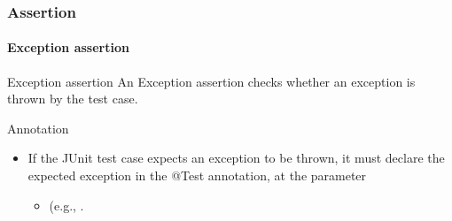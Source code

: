 \begin{frame}[parent={concept:assertion}, hasprev=false, hasnext=false]
\frametitle{Assertion}
\framesubtitle{Exception assertion}
\label{concept:junit-exception-assertion}
\label{concept:exception-assertion}

\begin{block:concept}{Exception assertion}
An Exception assertion checks whether an exception is thrown by the test case.
\end{block:concept}


\begin{block:fact}{Annotation}
\begin{itemize}
	\item If the JUnit test case expects an exception to be thrown, it must
	declare the expected exception in the @Test annotation, at the
	 parameter
	\begin{itemize}
		\item (e.g., .
	\end{itemize}
\end{itemize}
\end{block:fact}

\hfill
{}
\end{frame}